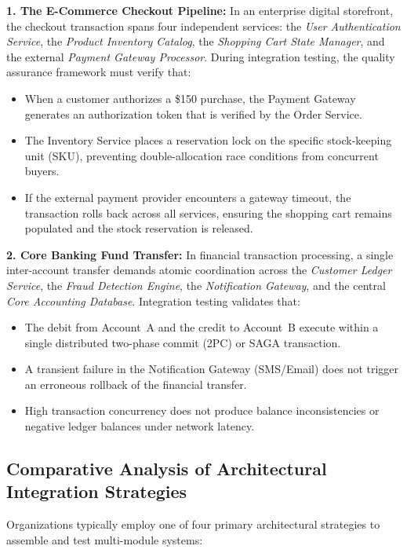 \documentclass[11pt,a4paper]{article}
\begin{document}
\textbf{1. The E-Commerce Checkout Pipeline:} In an enterprise digital storefront, the checkout transaction spans four independent services: the \textit{User Authentication Service}, the \textit{Product Inventory Catalog}, the \textit{Shopping Cart State Manager}, and the external \textit{Payment Gateway Processor}. During integration testing, the quality assurance framework must verify that:
\begin{itemize}
    \item When a customer authorizes a \$150 purchase, the Payment Gateway generates an authorization token that is verified by the Order Service.
    \item The Inventory Service places a reservation lock on the specific stock-keeping unit (SKU), preventing double-allocation race conditions from concurrent buyers.
    \item If the external payment provider encounters a gateway timeout, the transaction rolls back across all services, ensuring the shopping cart remains populated and the stock reservation is released.
\end{itemize}

\textbf{2. Core Banking Fund Transfer:} In financial transaction processing, a single inter-account transfer demands atomic coordination across the \textit{Customer Ledger Service}, the \textit{Fraud Detection Engine}, the \textit{Notification Gateway}, and the central \textit{Core Accounting Database}. Integration testing validates that:
\begin{itemize}
    \item The debit from Account~A and the credit to Account~B execute within a single distributed two-phase commit (2PC) or SAGA transaction.
    \item A transient failure in the Notification Gateway (SMS/Email) does not trigger an erroneous rollback of the financial transfer.
    \item High transaction concurrency does not produce balance inconsistencies or negative ledger balances under network latency.
\end{itemize}

\subsection{Comparative Analysis of Architectural Integration Strategies}
Organizations typically employ one of four primary architectural strategies to assemble and test multi-module systems:
\end{document}
